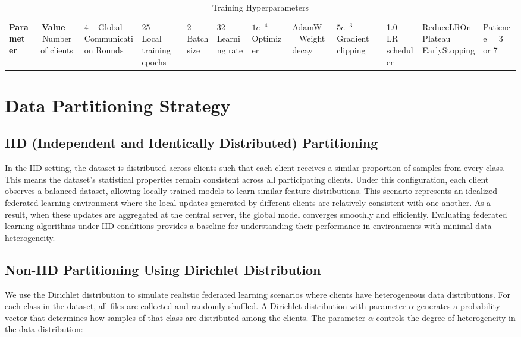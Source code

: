 \documentclass[12pt]{book}
\begin{document}
\begin{table}[h]
\centering
\caption{Training Hyperparameters}
\begin{tabular}{|l|c|}
\hline
\textbf{Parameter} & \textbf{Value} \ \hline
Number of clients & 4 \ \hline
Global Communication Rounds & 25 \ \hline
Local training epochs & 2 \ \hline
Batch size & 32 \ \hline
Learning rate & $1e^{-4}$ \ \hline
Optimizer & AdamW \ \hline
Weight decay & $5e^{-3}$ \ \hline
Gradient clipping & 1.0 \ \hline
LR scheduler & ReduceLROnPlateau \ \hline
EarlyStopping & Patience = 3 or 7 \ \hline
\end{tabular}
\label{tab:training_params}
\end{table}

\vspace{2.5cm}

\section{Data Partitioning Strategy}

\subsection{IID (Independent and Identically Distributed) Partitioning}

In the IID setting, the dataset is distributed across clients such that each client receives a similar proportion of samples from every class. This means the dataset's statistical properties remain consistent across all participating clients. Under this configuration, each client observes a balanced dataset, allowing locally trained models to learn similar feature distributions.
This scenario represents an idealized federated learning environment where the local updates generated by different clients are relatively consistent with one another. As a result, when these updates are aggregated at the central server, the global model converges smoothly and efficiently. Evaluating federated learning algorithms under IID conditions provides a baseline for understanding their performance in environments with minimal data heterogeneity.

\subsection{Non-IID Partitioning Using Dirichlet Distribution}

We use the Dirichlet distribution to simulate realistic federated learning scenarios where clients have heterogeneous data distributions. For each class in the dataset, all files are collected and randomly shuffled. A Dirichlet distribution with parameter $\alpha$ generates a probability vector that determines how samples of that class are distributed among the clients. The parameter $\alpha$ controls the degree of heterogeneity in the data distribution:
\end{document}
